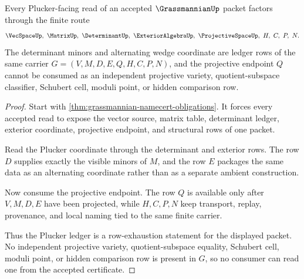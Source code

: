 \begin{theorem}
\label{thm:grassmannian-plucker-ledger}
Every Plucker-facing read of an accepted $\GrassmannianUp$ packet factors through the finite route
$$
\VecSpaceUp,\ \MatrixUp,\ \DeterminantUp,\ \ExteriorAlgebraUp,\ \ProjectiveSpaceUp,\ H,\ C,\ P,\ N .
$$
The determinant minors and alternating wedge coordinate are ledger rows of the same carrier $G=(V,M,D,E,Q,H,C,P,N)$, and the projective endpoint $Q$ cannot be consumed as an independent projective variety, quotient-subspace classifier, Schubert cell, moduli point, or hidden comparison row.
\end{theorem}
\begin{proof}
Start with \autoref{thm:grassmannian-namecert-obligations}. It forces every accepted read to expose the vector source, matrix table, determinant ledger, exterior coordinate, projective endpoint, and structural rows of one packet.

Read the Plucker coordinate through the determinant and exterior rows. The row $D$ supplies exactly the visible minors of $M$, and the row $E$ packages the same data as an alternating coordinate rather than as a separate ambient construction.

Now consume the projective endpoint. The row $Q$ is available only after $V,M,D,E$ have been projected, while $H,C,P,N$ keep transport, replay, provenance, and local naming tied to the same finite carrier.

Thus the Plucker ledger is a row-exhaustion statement for the displayed packet. No independent projective variety, quotient-subspace equality, Schubert cell, moduli point, or hidden comparison row is present in $G$, so no consumer can read one from the accepted certificate.
\end{proof}




